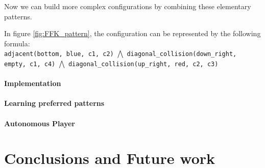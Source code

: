 \documentclass[12pt,twoside]{report}
\begin{document}
\bigskip

Now we can build more complex configurations by combining these elementary patterns.

\begin{example}
In figure \ref{fig:FFK_pattern}, the configuration can be represented by the following formula:\\
\texttt{adjacent(bottom, blue, c1, c2)} $\bigwedge$ \texttt{diagonal\_collision(down\_right, empty, c1, c4)} $\bigwedge$ \texttt{diagonal\_collision(up\_right, red, c2, c3)}
\end{example}


\subsubsection{Implementation}


\subsubsection{Learning preferred patterns}





\subsubsection{Autonomous Player}




\chapter{Conclusions and Future work}
\end{document}
